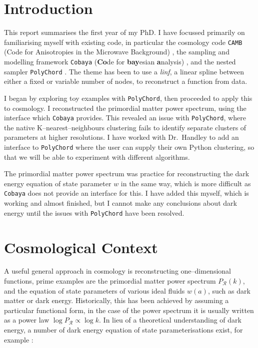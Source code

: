 \documentclass{article}
\begin{document}
\newpage

\tableofcontents

\newpage

\section{Introduction}
This report summarises the first year of my PhD. I have focussed primarily on familiarising myself with existing code, in particular the cosmology code \texttt{CAMB} (Code for Anisotropies in the Microwave Background) \cite{CAMB_1, CAMB_2}, the sampling and modelling framework \texttt{Cobaya} (\textbf{Co}de for \textbf{bay}esian \textbf{a}nalysis) \cite{Cobaya}, and the nested sampler \texttt{PolyChord} \cite{PolyChord_1, PolyChord_2}. The theme has been to use a \textit{linf}, a linear spline between either a fixed or variable number of nodes, to reconstruct a function from data.

I began by exploring toy examples with \texttt{PolyChord}, then proceeded to apply this to cosmology. I reconstructed the primordial matter power spectrum, using the interface which \texttt{Cobaya} provides. This revealed an issue with \texttt{PolyChord}, where the native K--nearest--neighbours clustering fails to identify separate clusters of parameters at higher resolutions. I have worked with Dr.~Handley to add an interface to \texttt{PolyChord} where the user can supply their own Python clustering, so that we will be able to experiment with different algorithms.

The primordial matter power spectrum was practice for reconstructing the dark energy equation of state parameter $w$ in the same way, which is more difficult as \texttt{Cobaya} does not provide an interface for this. I have added this myself, which is working and almost finished, but I cannot make any conclusions about dark energy until the issues with \texttt{PolyChord} have been resolved. 

\section{Cosmological Context}
\label{sec:context}

A useful general approach in cosmology is reconstructing one--dimensional functions, prime examples are the primordial matter power spectrum $P_\mathcal R(k)$, and the equation of state parameters of various ideal fluids $w(a)$, such as dark matter or dark energy. Historically, this has been achieved by assuming a particular functional form, in the case of the power spectrum it is usually written as a power law $\log{P_\mathcal R} \propto \log{k}$. In lieu of a theoretical understanding of dark energy, a number of dark energy equation of state parameterisations exist, for example \cite{Vazquez_2012}:
\end{document}
